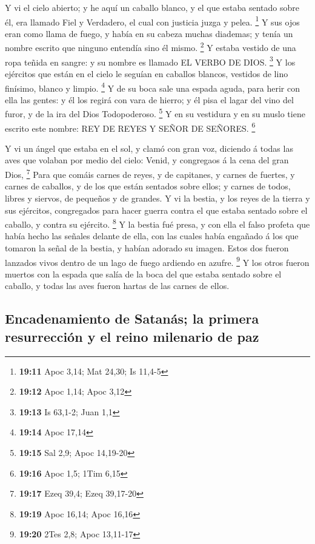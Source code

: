  Y vi el cielo abierto; y he aquí un caballo blanco, y el
que estaba sentado sobre él, era llamado Fiel y Verdadero, el cual con
justicia juzga y pelea. \footnote{\textbf{19:11} Apoc 3,14; Mat 24,30;
  Is 11,4-5}  Y sus ojos eran como llama de fuego, y había
en su cabeza muchas diademas; y tenía un nombre escrito que ninguno
entendía sino él mismo. \footnote{\textbf{19:12} Apoc 1,14; Apoc 3,12}
 Y estaba vestido de una ropa teñida en sangre: y su nombre
es llamado EL VERBO DE DIOS. \footnote{\textbf{19:13} Is 63,1-2; Juan
  1,1}  Y los ejércitos que están en el cielo le seguían en
caballos blancos, vestidos de lino finísimo, blanco y limpio.
\footnote{\textbf{19:14} Apoc 17,14}  Y de su boca sale una
espada aguda, para herir con ella las gentes: y él los regirá con vara
de hierro; y él pisa el lagar del vino del furor, y de la ira del Dios
Todopoderoso. \footnote{\textbf{19:15} Sal 2,9; Apoc 14,19-20}
 Y en su vestidura y en su muslo tiene escrito este nombre:
REY DE REYES Y SEÑOR DE SEÑORES. \footnote{\textbf{19:16} Apoc 1,5; 1Tim
  6,15}

 Y vi un ángel que estaba en el sol, y clamó con gran voz,
diciendo á todas las aves que volaban por medio del cielo: Venid, y
congregaos á la cena del gran Dios, \footnote{\textbf{19:17} Ezeq 39,4;
  Ezeq 39,17-20}  Para que comáis carnes de reyes, y de
capitanes, y carnes de fuertes, y carnes de caballos, y de los que están
sentados sobre ellos; y carnes de todos, libres y siervos, de pequeños y
de grandes.  Y vi la bestia, y los reyes de la tierra y sus
ejércitos, congregados para hacer guerra contra el que estaba sentado
sobre el caballo, y contra su ejército. \footnote{\textbf{19:19} Apoc
  16,14; Apoc 16,16}  Y la bestia fué presa, y con ella el
falso profeta que había hecho las señales delante de ella, con las
cuales había engañado á los que tomaron la señal de la bestia, y habían
adorado su imagen. Estos dos fueron lanzados vivos dentro de un lago de
fuego ardiendo en azufre. \footnote{\textbf{19:20} 2Tes 2,8; Apoc
  13,11-17}  Y los otros fueron muertos con la espada que
salía de la boca del que estaba sentado sobre el caballo, y todas las
aves fueron hartas de las carnes de ellos.

\hypertarget{encadenamiento-de-satanuxe1s-la-primera-resurrecciuxf3n-y-el-reino-milenario-de-paz}{%
\subsection{Encadenamiento de Satanás; la primera resurrección y el
reino milenario de
paz}\label{encadenamiento-de-satanuxe1s-la-primera-resurrecciuxf3n-y-el-reino-milenario-de-paz}}

